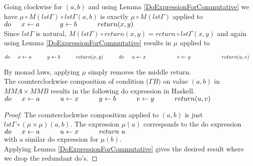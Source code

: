 \documentclass[submission,copyright]{eptcs}
\begin{document}
Going clockwise for $(a,b)$ and using Lemma \ref{DoExpressionForCommutative} we have
$\mu \circ M(lst\Gamma) \circ lst\Gamma (a, b)$ is exactly $\mu \circ M(lst\Gamma)$ applied to \\ 
$ do \indent x \leftarrow a \\
\indent \indent y \leftarrow b \\
\indent \indent return (x,y)$\\

Since $lst\Gamma$ is natural, $M(lst\Gamma)\circ return (x,y) = return \circ lst\Gamma (x,y)$ and again using Lemma \ref{DoExpressionForCommutative} results in $\mu$ applied to \\
\medskip

$  do \indent x \leftarrow a \\
\indent \indent y \leftarrow b \\
\indent \indent return (x,y) \\
\indent \indent do \indent u \leftarrow x \\
\indent \indent \indent \indent v \leftarrow y \\
\indent \indent \indent \indent return (u,v)$

By monad laws, applying $\mu$ simply removes the middle return.\\


 The counterclockwise composition of condition ($\Gamma B)$ on value $(a,b)$ in $MMA \times MMB$ results in the following do expression in Haskell.\\

$do \indent x \leftarrow a \\
\indent \indent u \leftarrow x \\
\indent \indent y \leftarrow b \\
\indent \indent v \leftarrow y \\
\indent \indent return (u,v)$\\

\begin{proof}
The counterclockwise composition applied to $(a,b)$ is just $lst\Gamma \circ (\mu \times \mu)(a, b)$. The expression $\mu(a)$ corresponds to the do expression\\
$ do \indent x \leftarrow a \\
\indent \indent u \leftarrow x \\
\indent \indent return ~u $ \\
with a similar do expression for $\mu(b)$.\\
Applying Lemma \ref{DoExpressionForCommutative} gives the desired result where we drop the redundant do's.
\end{proof}
\end{document}
